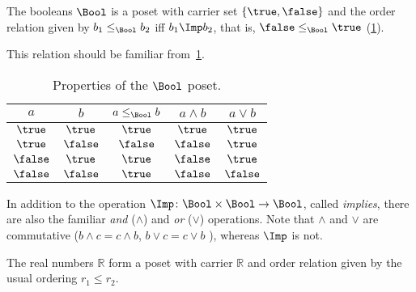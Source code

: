 \begin{example}[Booleans]\label{ex:bool}
The booleans $\Bool$ is a poset with carrier set $\{\true,\false\}$ and the order relation given by $b_1 \leq_\Bool b_2$ iff $b_1 \Imp b_2$, that is, $\false \leq_\Bool \true$ (\cref{fig:boolean}).

\begin{figure}[h!]
   \centering
   \caption{\label{fig:boolean}}
\end{figure}

\noindent This relation should be familiar from~\cref{tab:boolposet}.
\begin{table}[h!]
\begin{center}
\begin{tabular}{cc|ccc}
$a$ & $b$ & $a \leq_\Bool b$ & $a \wedge b$ & $a \vee b$ \\ \hline
$\true$&$\true$&$\true$&$\true$&$\true$\\
$\true$&$\false$&$\false$&$\false$&$\true$\\
$\false$&$\true$&$\true$&$\false$&$\true$\\
$\false$&$\false$&$\true$&$\false$&$\false$
\end{tabular}
\end{center}
\caption{Properties of the $\Bool$ poset. \label{tab:boolposet}}
\end{table}
In addition to the operation $\Imp\colon\Bool\times \Bool\to\Bool$, called \emph{implies}, there are also the familiar \emph{and} ($\wedge$) and \emph{or} ($\vee$) operations. Note that $\wedge$ and $\vee$ are commutative ($b\wedge c = c\wedge b$, $b\vee c = c\vee b$ ), whereas $\Imp$ is not.
\end{example}




\begin{example}[Reals]
The real numbers $\mathbb{R}$ form a poset with carrier $\mathbb{R}$ and order relation given by the usual ordering $r_1 \leq r_2$.
\end{example}


